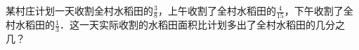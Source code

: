 
某村庄计划一天收割全村水稻田的$\frac{3}{8}$，上午收割了全村水稻田的$\frac{4}{15}$，下午收割了全村水稻田的$\frac{1}{3}$．这一天实际收割的水稻田面积比计划多出了全村水稻田的几分之几？\\
